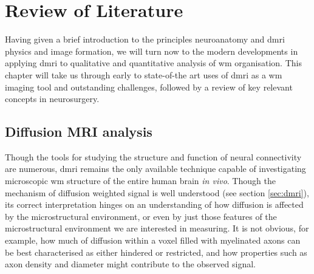 \chapter{Review of Literature}
\label{review}

Having given a brief introduction to the principles neuroanatomy and \gls{dmri} physics and image formation, we will turn now to the modern developments in applying \gls{dmri} to qualitative and quantitative analysis of \gls{wm} organisation.
This chapter will take us through early to state-of-the art uses of \gls{dmri} as a \gls{wm} imaging tool and outstanding challenges, followed by a review of key relevant concepts in neurosurgery.

\section{Diffusion MRI analysis}\label{sec:wms}

Though the tools for studying the structure and function of neural connectivity are numerous, \gls{dmri} remains the only available technique capable of investigating microscopic \gls{wm} structure of the entire human brain \textit{in vivo}.
Though the mechanism of diffusion weighted signal is well understood (see section \ref{sec:dmri}), its correct interpretation hinges on an understanding of how diffusion is affected by the microstructural environment\autocite{LeBihan1995}, or even by just those features of the microstructural environment we are interested in measuring.
It is not obvious, for example, how much of diffusion within a voxel filled with myelinated axons can be best characterised as either hindered or restricted, and how properties such as axon density and diameter might contribute to the observed signal.\autocite{Panagiotaki2012}


